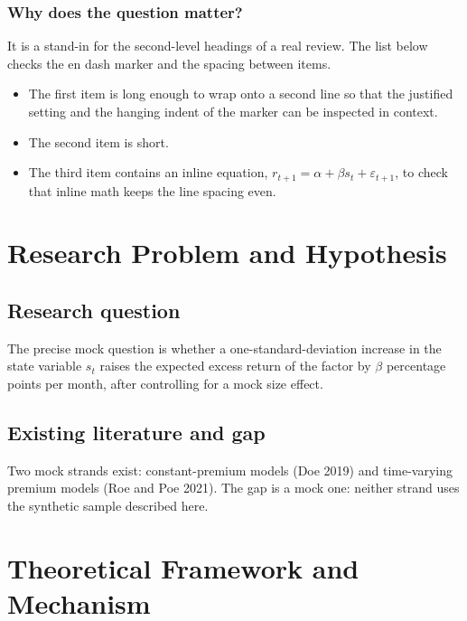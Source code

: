 \documentclass{lrreview}
\begin{document}
\subsubsection{Why does the question matter?}
It is a stand-in for the second-level headings of a real review. The list
below checks the en dash marker and the spacing between items.
\begin{itemize}
  \item The first item is long enough to wrap onto a second line so that the justified setting and the hanging indent of the marker can be inspected in context.
  \item The second item is short.
  \item The third item contains an inline equation, $r_{t+1} = \alpha + \beta s_t + \varepsilon_{t+1}$, to check that inline math keeps the line spacing even.
\end{itemize}

\section{Research Problem and Hypothesis}

\subsection{Research question}
The precise mock question is whether a one-standard-deviation increase in the
state variable $s_t$ raises the expected excess return of the factor by
$\beta$ percentage points per month, after controlling for a mock size effect.

\subsection{Existing literature and gap}
 Two mock strands exist: constant-premium models (Doe 2019) and
time-varying premium models (Roe and Poe 2021). The gap is a mock one: neither
strand uses the synthetic sample described here.

\section{Theoretical Framework and Mechanism}
\end{document}
